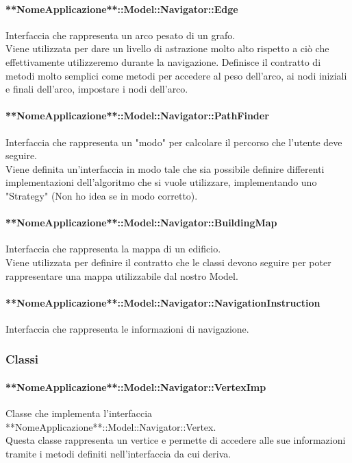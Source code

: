\documentclass[../SpecificaTecnica.tex]{subfiles}
\begin{document}
				\paragraph{**NomeApplicazione**::Model::Navigator::Edge}
					Interfaccia che rappresenta un arco pesato di un grafo. \\ 
					Viene utilizzata per dare un livello di astrazione molto alto rispetto a ciò che effettivamente utilizzeremo durante la navigazione. Definisce il contratto di metodi molto semplici come metodi per accedere al peso dell'arco, ai nodi iniziali e finali dell'arco, impostare i nodi dell'arco.
				\paragraph{**NomeApplicazione**::Model::Navigator::PathFinder}
					Interfaccia che rappresenta un "modo" per calcolare il percorso che l'utente deve seguire. \\ 
					Viene definita un'interfaccia in modo tale che sia possibile definire differenti implementazioni dell'algoritmo che si vuole utilizzare, implementando uno "Strategy" (Non ho idea se in modo corretto).
				\paragraph{**NomeApplicazione**::Model::Navigator::BuildingMap}
					Interfaccia che rappresenta la mappa di un edificio. \\
					Viene utilizzata per definire il contratto che le classi devono seguire per poter rappresentare una mappa utilizzabile dal nostro Model.
				\paragraph{**NomeApplicazione**::Model::Navigator::NavigationInstruction}
					Interfaccia che rappresenta le informazioni di navigazione. \\
			\subsubsection{Classi}
				\paragraph{**NomeApplicazione**::Model::Navigator::VertexImp}
					Classe che implementa l'interfaccia **NomeApplicazione**::Model::Navigator::Vertex. \\
					Questa classe rappresenta un vertice e permette di accedere alle sue informazioni tramite i metodi definiti nell'interfaccia da cui deriva.
\end{document}

